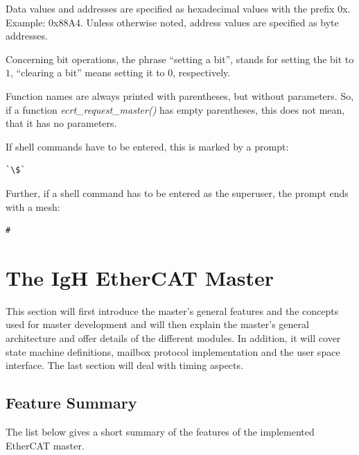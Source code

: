\documentclass[a4paper,12pt,BCOR6mm,bibtotoc,idxtotoc]{scrbook}
\begin{document}
Data values and addresses are specified as hexadecimal values with the
prefix 0x. Example: 0x88A4. Unless otherwise noted, address values are
specified as byte addresses.

Concerning bit operations, the phrase ``setting a bit'', stands for
setting the bit to $1$, ``clearing a bit'' means setting it to $0$,
respectively.

Function names are always printed with parentheses, but without
parameters. So, if a function \textit{ecrt\_request\_master()} has
empty parentheses, this does not mean, that it has no parameters.

If shell commands have to be entered, this is marked by a prompt:

\begin{lstlisting}[gobble=2]
  `\$`
\end{lstlisting}

Further, if a shell command has to be entered as the superuser, the
prompt ends with a mesh:

\begin{lstlisting}[gobble=2]
  #
\end{lstlisting}


\chapter{The IgH EtherCAT Master}
\label{chapter:master}

This section will first introduce the master's general features and
the concepts used for master development and will then explain the
master's general architecture and offer details of the different
modules. In addition, it will cover state machine definitions, mailbox
protocol implementation and the user space interface. The last section
will deal with timing aspects.


\section{Feature Summary}
\label{sec:summary}

The list below gives a short summary of the features of the
implemented EtherCAT master.
\end{document}
